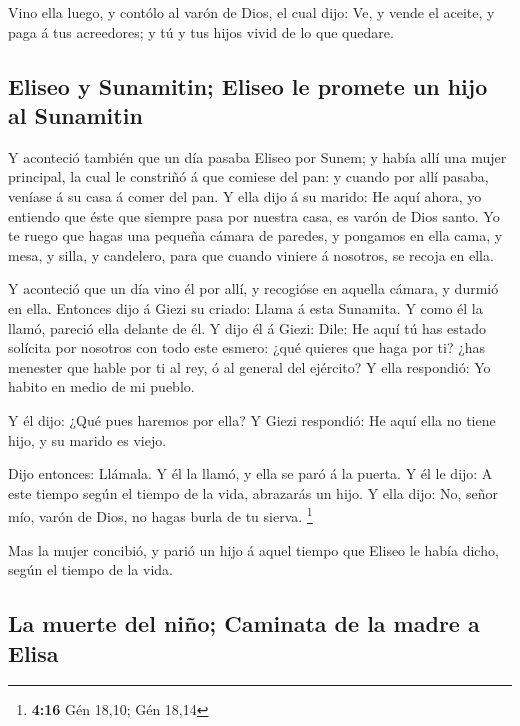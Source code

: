  Vino ella luego, y contólo al varón de Dios, el cual
dijo: Ve, y vende el aceite, y paga á tus acreedores; y tú y tus hijos
vivid de lo que quedare.

\hypertarget{eliseo-y-sunamitin-eliseo-le-promete-un-hijo-al-sunamitin}{%
\subsection{Eliseo y Sunamitin; Eliseo le promete un hijo al
Sunamitin}\label{eliseo-y-sunamitin-eliseo-le-promete-un-hijo-al-sunamitin}}

 Y aconteció también que un día pasaba Eliseo por Sunem; y
había allí una mujer principal, la cual le constriñó á que comiese del
pan: y cuando por allí pasaba, veníase á su casa á comer del pan.
 Y ella dijo á su marido: He aquí ahora, yo entiendo que
éste que siempre pasa por nuestra casa, es varón de Dios santo.
 Yo te ruego que hagas una pequeña cámara de paredes, y
pongamos en ella cama, y mesa, y silla, y candelero, para que cuando
viniere á nosotros, se recoja en ella.

 Y aconteció que un día vino él por allí, y recogióse en
aquella cámara, y durmió en ella.  Entonces dijo á Giezi
su criado: Llama á esta Sunamita. Y como él la llamó, pareció ella
delante de él.  Y dijo él á Giezi: Dile: He aquí tú has
estado solícita por nosotros con todo este esmero: ¿qué quieres que haga
por ti? ¿has menester que hable por ti al rey, ó al general del
ejército? Y ella respondió: Yo habito en medio de mi pueblo.

 Y él dijo: ¿Qué pues haremos por ella? Y Giezi
respondió: He aquí ella no tiene hijo, y su marido es viejo.

 Dijo entonces: Llámala. Y él la llamó, y ella se paró á
la puerta.  Y él le dijo: A este tiempo según el tiempo
de la vida, abrazarás un hijo. Y ella dijo: No, señor mío, varón de
Dios, no hagas burla de tu sierva. \footnote{\textbf{4:16} Gén 18,10;
  Gén 18,14}

 Mas la mujer concibió, y parió un hijo á aquel tiempo
que Eliseo le había dicho, según el tiempo de la vida.

\hypertarget{la-muerte-del-niuxf1o-caminata-de-la-madre-a-elisa}{%
\subsection{La muerte del niño; Caminata de la madre a
Elisa}\label{la-muerte-del-niuxf1o-caminata-de-la-madre-a-elisa}}


